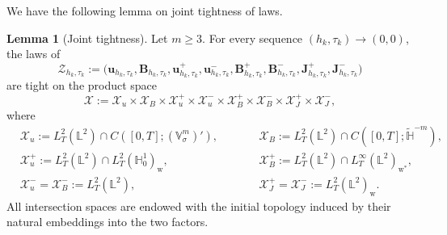 \documentclass[11pt, reqno]{amsart}
\theoremstyle{definition}
\newtheorem{lemma}[theorem]{Lemma}
\numberwithin{equation}{section}
\newcommand{\bff}{\boldsymbol}
\newcommand{\bb}{\mathbb}
\newcommand{\norm}[2]{\left\|{#1}\right\|_{#2}}
\newcommand{\abs}[1]{\left|{#1}\right|}
\begin{document}
%	

We have the following lemma on joint tightness of laws.

\begin{lemma}[Joint tightness]
	\label{lem:conv joint tightness}
	Let $m\ge3$. For every sequence $(h_k,\tau_k)\to(0,0)$, the laws of
	\[
	\mathcal Z_{h_k,\tau_k}
	:=
	\bigl(
	\bff u_{h_k,\tau_k},
	\bff B_{h_k,\tau_k},
	\bff u_{h_k,\tau_k}^{+},
	\bff u_{h_k,\tau_k}^{-},
	\bff B_{h_k,\tau_k}^{+},
	\bff B_{h_k,\tau_k}^{-},
	\bff J_{h_k,\tau_k}^{+},
	\bff J_{h_k,\tau_k}^{-}
	\bigr)
	\]
	are tight on the product space
	\[
	\mathcal X
	:=
	\mathcal X_u
	\times
	\mathcal X_B
	\times
	\mathcal X_{u}^{+}
	\times
	\mathcal X_u^{-}
	\times
	\mathcal X_B^{+}
	\times
	\mathcal X_B^{-}
	\times
	\mathcal X_J^{+}
	\times
	\mathcal X_J^{-},
	\]
	where
	\begin{subequations}
		\begin{alignat*}{2}
	&\mathcal X_u
	:=
	L^2_T(\bb L^2)
	\cap
	C([0,T];(\bb V^m_\sigma)'),
	\qquad
	&&\mathcal X_B
	:=
	L^2_T(\bb L^2)
	\cap
	C([0,T];\widetilde{\bb H}^{-m}),
	\\
	&\mathcal X_u^{+}
	:=
	L^2_T(\bb L^2)
	\cap
	L^2_T(\bb H_0^1)_{\mathrm w},
	\qquad
	&&\mathcal X_B^{+}
	:=
	L^2_T(\bb L^2)
	\cap
	L^\infty_T(\bb L^2)_{\mathrm w^*},
	\\
	&\mathcal X_u^{-}= \mathcal X_B^{-}:= L^2_T(\bb L^2),
	\qquad
	&&\mathcal X_J^{+}= \mathcal X_J^{-}:= L^2_T(\bb L^2)_{\mathrm w}.
		\end{alignat*}
	\end{subequations}
	All intersection spaces are endowed with the initial topology induced by their
	natural embeddings into the two factors.
\end{lemma}
\end{document}
